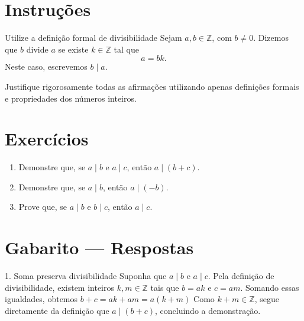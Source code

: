 \documentclass[12pt]{article}
\begin{document}
\vspace*{0.2cm}

\section*{Instruções}

\begin{block}{Utilize a definição formal de divisibilidade}
Sejam $a,b \in \mathbb{Z}$, com $b \neq 0$. Dizemos que $b$ divide $a$ se existe
$k \in \mathbb{Z}$ tal que
\[
a = bk.
\]
Neste caso, escrevemos $b \mid a$.
\end{block}

Justifique rigorosamente todas as afirmações utilizando apenas definições formais
e propriedades dos números inteiros.

\section*{Exercícios}

\begin{enumerate}

\item Demonstre que, se $a \mid b$ e $a \mid c$, então $a \mid (b+c)$.

\item Demonstre que, se $a \mid b$, então $a \mid (-b)$.

\item Prove que, se $a \mid b$ e $b \mid c$, então $a \mid c$.



\end{enumerate}

\newpage


\section*{Gabarito — Respostas}
\begin{block}{1. Soma preserva divisibilidade}
Suponha que $a \mid b$ e $a \mid c$. Pela definição de divisibilidade, existem
inteiros $k,m \in \mathbb{Z}$ tais que $b = ak$ e $c = am$. Somando essas
igualdades, obtemos $b + c = ak + am = a(k+m)$
Como $k+m \in \mathbb{Z}$, segue diretamente da definição que
$a \mid (b+c)$, concluindo a demonstração.
\end{block}
\end{document}
